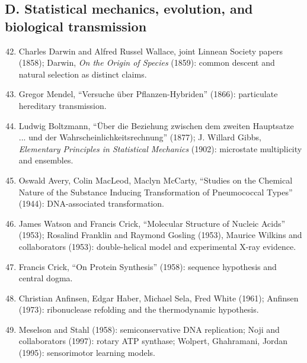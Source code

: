 \documentclass[10pt]{article}
\begin{document}
\subsection*{D. Statistical mechanics, evolution, and biological transmission}
\begin{enumerate}[itemsep=1pt,topsep=3pt]\setcounter{enumi}{41}
\item Charles Darwin and Alfred Russel Wallace, joint Linnean Society papers (1858); Darwin, \emph{On the Origin of Species} (1859): common descent and natural selection as distinct claims.
\item Gregor Mendel, ``Versuche \"uber Pflanzen-Hybriden'' (1866): particulate hereditary transmission.
\item Ludwig Boltzmann, ``\"Uber die Beziehung zwischen dem zweiten Hauptsatze ... und der Wahrscheinlichkeitsrechnung'' (1877); J. Willard Gibbs, \emph{Elementary Principles in Statistical Mechanics} (1902): microstate multiplicity and ensembles.
\item Oswald Avery, Colin MacLeod, Maclyn McCarty, ``Studies on the Chemical Nature of the Substance Inducing Transformation of Pneumococcal Types'' (1944): DNA-associated transformation.
\item James Watson and Francis Crick, ``Molecular Structure of Nucleic Acids'' (1953); Rosalind Franklin and Raymond Gosling (1953), Maurice Wilkins and collaborators (1953): double-helical model and experimental X-ray evidence.
\item Francis Crick, ``On Protein Synthesis'' (1958): sequence hypothesis and central dogma.
\item Christian Anfinsen, Edgar Haber, Michael Sela, Fred White (1961); Anfinsen (1973): ribonuclease refolding and the thermodynamic hypothesis.
\item Meselson and Stahl (1958): semiconservative DNA replication; Noji and collaborators (1997): rotary ATP synthase; Wolpert, Ghahramani, Jordan (1995): sensorimotor learning models.
\end{enumerate}
\end{document}
